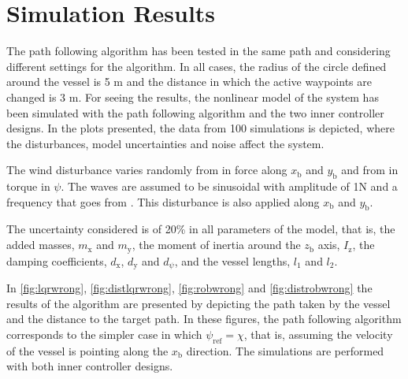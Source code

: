 \section{Simulation Results}
The path following algorithm has been tested in the same path and considering different settings for the algorithm. In all cases, the radius of the circle defined around the vessel is 5 m and the distance in which the active waypoints are changed is 3 m.  For seeing the results, the nonlinear model of the system has been simulated with the path following algorithm and the two inner controller designs. In the plots presented, the data from 100 simulations is depicted, where the disturbances, model uncertainties and noise affect the system.

The wind disturbance varies randomly from  in force along $x_\mathrm{b}$ and $y_\mathrm{b}$ and from  in torque in $\psi$. The waves are assumed to be sinusoidal with amplitude of 1N and a frequency that goes from . This disturbance is also applied along $x_\mathrm{b}$ and $y_\mathrm{b}$. 

The uncertainty considered is of 20\% in all parameters of the model, that is, the added masses, $m_\mathrm{x}$ and $m_\mathrm{y}$, the moment of inertia around the $z_\mathrm{b}$ axis, $I_\mathrm{z}$, the damping coefficients, $d_\mathrm{x}$, $d_\mathrm{y}$ and $d_\psi$, and the vessel lengths, $l_1$ and $l_2$.  

In \autoref{fig:lqrwrong}, \ref{fig:distlqrwrong}, \ref{fig:robwrong} and \ref{fig:distrobwrong} the results of the algorithm are presented by depicting the path taken by the vessel and the distance to the target path. In these figures, the path following algorithm corresponds to the simpler case in which $\psi_\mathrm{ref} = \chi$, that is, assuming the velocity of the vessel is pointing along the $x_\mathrm{b}$ direction. The simulations are performed with both inner controller designs. 


